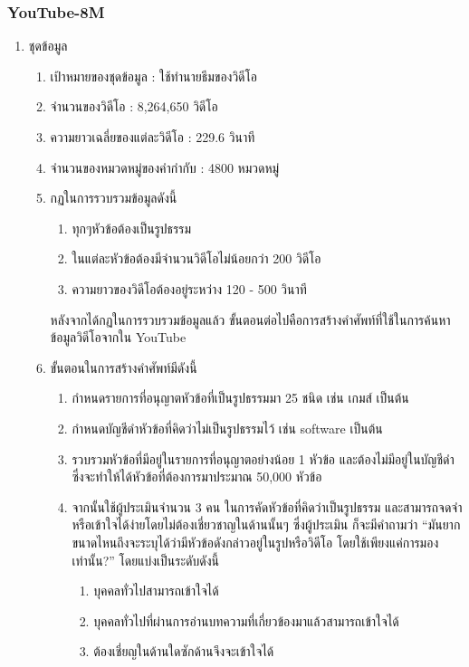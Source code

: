 \subsubsection*{YouTube-8M} 
\begin{enumerate}
	\item {ชุดข้อมูล}
	\begin{enumerate}
		\setlength\itemsep{-0.25em}
		\item เป้าหมายของชุดข้อมูล : ใช้ทำนายธีมของวิดีโอ
		\item จำนวนของวิดีโอ : 8,264,650 วิดีโอ
		\item ความยาวเฉลี่ยของแต่ละวิดีโอ : 229.6 วินาที
		\item จำนวนของหมวดหมู่ของคำกำกับ : 4800 หมวดหมู่
		\item กฏในการรวบรวมข้อมูลดังนี้
		\begin{enumerate}
			\setlength\itemsep{-0.25em}
			\item ทุกๆหัวข้อต้องเป็นรูปธรรม
			\item ในแต่ละหัวข้อต้องมีจำนวนวิดีโอไม่น้อยกว่า 200 วิดีโอ
			\item ความยาวของวิดีโอต้องอยู่ระหว่าง 120 - 500 วินาที
		\end{enumerate}
		หลังจากได้กฏในการรวบรวมข้อมูลแล้ว ขั้นตอนต่อไปคือการสร้างคำศัพท์ที่ใช้ในการค้นหาข้อมูลวิดีโอจากใน YouTube 
		\item ขั้นตอนในการสร้างคำศัพท์มีดังนี้
		\begin{enumerate}
			\setlength\itemsep{-0.25em}
			\item กำหนดรายการที่อนุญาตหัวข้อที่เป็นรูปธรรมมา 25 ชนิด เช่น เกมส์ เป็นต้น
			\item กำหนดบัญชีดำหัวข้อที่คิดว่าไม่เป็นรูปธรรมไว้ เช่น software เป็นต้น
			\item รวบรวมหัวข้อที่มีอยู่ในรายการที่อนุญาตอย่างน้อย 1 หัวข้อ และต้องไม่มีอยู่ในบัญชีดำซึ่งจะทำให้ได้หัวข้อที่ต้องการมาประมาณ 50,000 หัวข้อ
			\item จากนั้นใช้ผู้ประเมินจำนวน 3 คน ในการคัดหัวข้อที่คิดว่าเป็นรูปธรรม และสามารถจดจำหรือเข้าใจได้ง่ายโดยไม่ต้องเชี่ยวชาญในด้านนั้นๆ 
			ซึ่งผู้ประเมิน ก็จะมีคำถามว่า “มันยากขนาดไหนถึงจะระบุได้ว่ามีหัวข้อดังกล่าวอยู่ในรูปหรือวิดีโอ โดยใช้เพียงแค่การมองเท่านั้น?” โดยแบ่งเป็นระดับดังนี้
			\begin{enumerate}
				\setlength\itemsep{-0.25em}
				\item บุคคลทั่วไปสามารถเข้าใจได้
				\item บุคคลทั่วไปที่ผ่านการอ่านบทความที่เกี่ยวข้องมาแล้วสามารถเข้าใจได้
				\item ต้องเชี่ยญในด้านใดซักด้านจึงจะเข้าใจได้

\end{enumerate}
\end{enumerate}
\end{enumerate}
\end{enumerate}
